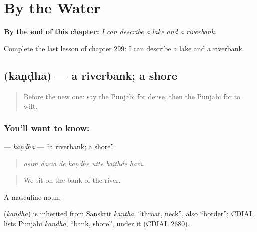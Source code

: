 
\chapter{By the Water}
\label{ch:pa-a2-by-the-water}

\begin{chapteropening}
\textbf{By the end of this chapter:} \emph{I can describe a lake and a riverbank.}

Complete the last lesson of chapter 299: I can describe a lake and a riverbank.
\end{chapteropening}

\section[\texorpdfstring{\pa{ਕੰਢਾ} (kaṇḍhā)}{ਕੰਢਾ (kaṇḍhā)}]{ (kaṇḍhā) — a riverbank; a shore}

\label{lesson:PA-C299-kandha}



\begin{quote}
Before the new one: say the Punjabi for dense, then the Punjabi for to wilt.
\end{quote}

\subsection*{You'll want to know: }
\textbf{} — \emph{kaṇḍhā} — \textquotedblleft{}a riverbank; a shore\textquotedblright{}.

\begin{quote}
      
\end{quote}

\begin{quote}
\emph{asīṁ dariā de kaṇḍhe utte baiṭhde hāṁ.}
\end{quote}

\begin{quote}
We sit on the bank of the river.
\end{quote}

A masculine noun.

\begin{cousinweb}
\textbf{} (\emph{kaṇḍhā}) is inherited from Sanskrit \emph{kaṇṭha}, \textquotedblleft{}throat, neck\textquotedblright{}, also \textquotedblleft{}border\textquotedblright{}; CDIAL lists Punjabi \emph{kaṇḍhā}, \textquotedblleft{}bank, shore\textquotedblright{}, under it (CDIAL 2680).
\end{cousinweb}

